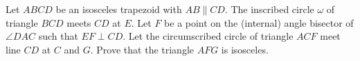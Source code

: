 Let $ABCD$ be an isosceles trapezoid with $AB \parallel CD$. The inscribed circle $\omega$ of triangle $BCD$ meets $CD$ at $E$. Let $F$ be a point on the (internal) angle bisector of $\angle DAC$ such that $EF \perp CD$. Let the circumscribed circle of triangle $ACF$ meet line $CD$ at $C$ and $G$. Prove that the triangle $AFG$ is isosceles.